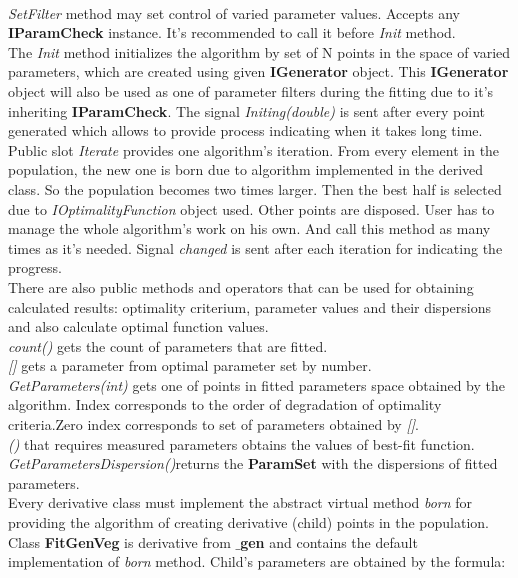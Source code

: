 \documentclass[a4paper]{article}
\begin{document}
\\
\textit{SetFilter} method may set control of varied parameter values. Accepts any \textbf{IParamCheck} instance. 
It's recommended to call it before \textit{Init} method.
\\
The \textit{Init} method initializes the algorithm by set of N points in the space of varied parameters, which are created using given \textbf{IGenerator} object.
This \textbf{IGenerator} object will also be used as one of parameter filters during the fitting due to it's inheriting \textbf{IParamCheck}.
The signal \textit{Initing(double)} is sent after every point generated which allows to provide process indicating when it takes long time.
\\
Public slot \textit{Iterate} provides one algorithm's iteration.
From every element in the population, the new one is born due to algorithm implemented in the derived class.
So the population becomes two times larger.
Then the best half is selected due to \textit{IOptimalityFunction} object used.
Other points are disposed.
User has to manage the whole algorithm's work on his own. And call this method as many times as it's needed.
Signal \textit{changed} is sent after each iteration for indicating the progress.
\\
There are also public methods and operators that can be used for obtaining calculated results: optimality criterium, parameter values and their dispersions and also calculate optimal function values.\\
\textit{count()} gets the count of parameters that are fitted.\\
\textit{[]} gets a parameter from optimal parameter set by number.\\
\textit{GetParameters(int)} gets one of points in fitted parameters space obtained by the algorithm. Index corresponds to the order of degradation of optimality criteria.Zero index corresponds to set of parameters obtained by \textit{[]}.\\
\textit{()} that requires measured parameters obtains the values of best-fit function.\\
\textit{GetParametersDispersion()}returns the \textbf{ParamSet} with the dispersions of fitted parameters.
\\
Every derivative class must implement the abstract virtual method \textit{born} for providing the algorithm of creating derivative (child) points in the population.
\\
Class \textbf{FitGenVeg} is derivative from \textbf{$\_$gen} and contains the default implementation of \textit{born} method. Child's parameters are obtained by the formula:
\end{document}
